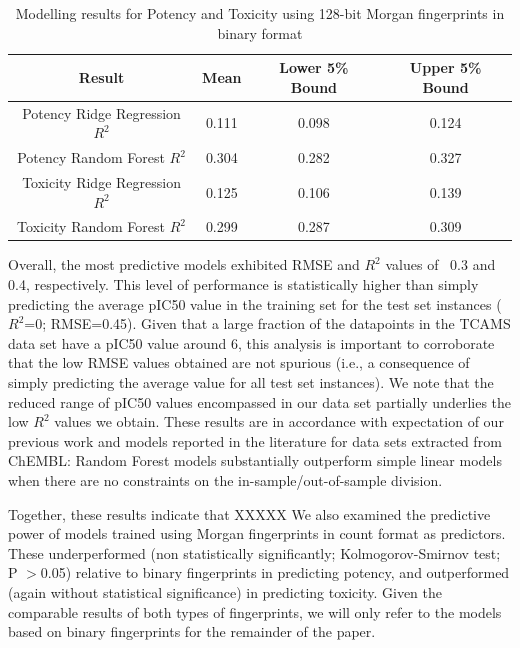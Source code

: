 \documentclass[journal=jacsat,manuscript=article]{achemso}
\begin{document}
\begin{table}[h!]
\centering
 \begin{tabular}{||c c c c||} 
 \hline
 Result & Mean & Lower 5\% Bound & Upper 5\% Bound \\ [0.5ex] 
 \hline\hline
Potency Ridge Regression $R^2$ & 0.111 & 0.098 & 0.124 \\ 
 \hline
Potency Random Forest $R^2$ & 0.304 & 0.282 & 0.327 \\
 \hline
Toxicity Ridge Regression $R^2$ & 0.125 & 0.106 & 0.139 \\
 \hline
Toxicity Random Forest $R^2$ & 0.299 & 0.287 & 0.309\\
 \hline
\end{tabular}
\caption{Modelling results for Potency and Toxicity using 128-bit Morgan fingerprints in binary format}
\label{table:Potency}
\end{table}


Overall, the most predictive models exhibited RMSE and $R^2$ values of ~0.3 and 0.4, respectively. 
This level of performance is statistically higher than simply predicting the average pIC50 value in the training set for the test set instances ($R^2$=0; RMSE=0.45). Given that a large fraction of the datapoints in the TCAMS data set have a pIC50 value around 6, this analysis is important to corroborate that the low RMSE values obtained are not spurious (i.e., a consequence of simply predicting the average value for all test  set instances). We note that the reduced range of pIC50 values encompassed in our data set partially underlies the low $R^2$ values we obtain\cite{Alexander2015}.
These results are in accordance with expectation of our previous work\citep{et1:} and models reported in the literature for data sets extracted from ChEMBL: Random Forest models substantially outperform simple linear models when there are no constraints on the in-sample/out-of-sample division.

Together, these results indicate that XXXXX
\newline
\newline
We also examined the predictive power of models trained using  Morgan fingerprints in count format as predictors. These underperformed (non statistically significantly; Kolmogorov-Smirnov test; P $>$0.05) relative to binary fingerprints in predicting potency, and outperformed (again without statistical significance) in predicting toxicity.  
Given the comparable results of both types of fingerprints, we will only refer to the models based on binary fingerprints for the remainder of the paper.
\end{document}
